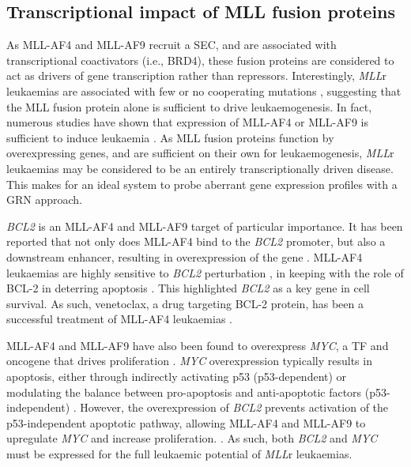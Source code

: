 \subsection{Transcriptional impact of MLL fusion proteins}

As MLL-AF4 and MLL-AF9 recruit a SEC, and are associated with transcriptional coactivators (i.e., BRD4), these fusion proteins are considered to act as drivers of gene transcription rather than repressors. Interestingly, \textit{MLL}r leukaemias are associated with few or no cooperating mutations \citep{andersson_landscape_2015, the_cancer_genome_atlas_research_network_genomic_2013, bardini_dna_2010, bardini_implementation_2011}, suggesting that the MLL fusion protein alone is sufficient to drive leukaemogenesis. In fact, numerous studies have shown that expression of MLL-AF4 or MLL-AF9 is sufficient to induce leukaemia \citep{rice_human_2021, krivtsov_h3k79_2008, krivtsov_cell_2013}. As MLL fusion proteins function by overexpressing genes, and are sufficient on their own for leukaemogenesis, \textit{MLL}r leukaemias may be considered to be an entirely transcriptionally driven disease. This makes for an ideal system to probe aberrant gene expression profiles with a GRN approach.

\textit{BCL2} is an MLL-AF4 and MLL-AF9 target of particular importance. It has been reported that not only does MLL-AF4 bind to the \textit{BCL2} promoter, but also a downstream enhancer, resulting in overexpression of the gene \citep{godfrey_mll-af4_2017, benito_mll-rearranged_2015}. MLL-AF4 leukaemias are highly sensitive to \textit{BCL2} perturbation \citep{robinson_abundant_2008}, in keeping with the role of BCL-2 in deterring apoptosis \citep{czabotar_control_2014, singh_regulation_2019}. This highlighted \textit{BCL2} as a key gene in cell survival. As such, venetoclax, a drug targeting BCL-2 protein, has been a successful treatment of MLL-AF4 leukaemias \citep{benito_mll-rearranged_2015, khaw_venetoclax_2016, niu_acute_2014}. 

MLL-AF4 and MLL-AF9 have also been found to overexpress \textit{MYC}, a TF and oncogene that drives proliferation \citep{dang_myc_2012, prange_mll-af9_2017}. \textit{MYC} overexpression typically results in apoptosis, either through indirectly activating p53 (p53-dependent) or modulating the balance between pro-apoptosis and anti-apoptotic factors (p53-independent) \citep{fairlie_co-operativity_2021}. However, the overexpression of \textit{BCL2} prevents activation of the p53-independent apoptotic pathway, allowing MLL-AF4 and MLL-AF9 to upregulate \textit{MYC} and increase proliferation. \citep{fairlie_co-operativity_2021, fanidi_cooperative_1992, bissonnette_apoptotic_1992}. As such, both \textit{BCL2} and \textit{MYC} must be expressed for the full leukaemic potential of \textit{MLL}r leukaemias.

